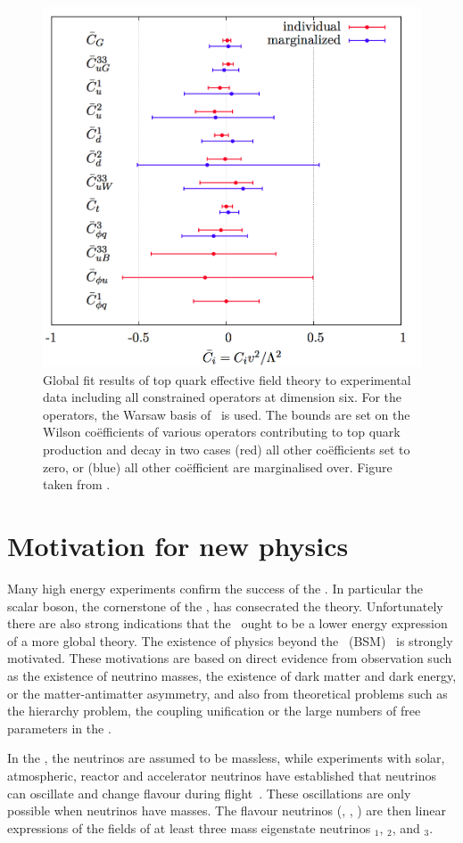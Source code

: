 \begin{figure}[htbp]
	\centering
	\includegraphics[width=0.6\linewidth]{1_Introduction/Figures/anomlouscouplings}
	\caption{Global fit results of top quark effective field theory to experimental data including all constrained operators at dimension six. For the operators, the Warsaw basis of~\cite{Grzadkowski:2010es} is used. The bounds are set on the Wilson co\"efficients of various operators contributing to top quark production and decay in two cases (red) all other co\"efficients set to zero, or (blue) all other co\"efficient are marginalised over. Figure taken from \cite{Buckley:2015lku}. }
	\label{fig:anomlouscouplings}
\end{figure}


\clearpage
\section{Motivation for new physics}
\label{sec:BSM}
Many high energy experiments confirm the success of the \SM. In particular the scalar boson, the cornerstone of the \SM, has consecrated the theory. Unfortunately there are also strong indications that the \SM\ ought to be a lower energy expression of a more global theory. The existence of physics beyond the \SM\ (BSM)~\cite{BSMWiley} is strongly motivated. These motivations are based on direct evidence from observation such as the existence of neutrino masses, the existence of dark matter and dark energy, or the matter-antimatter asymmetry, and also from theoretical problems such as the hierarchy problem, the coupling unification or the large numbers of free parameters in the \SM. 


In the \SM, the neutrinos are assumed to be massless, while experiments with solar, atmospheric, reactor and accelerator neutrinos have established that neutrinos can oscillate and change flavour during flight~\cite{Fukuda:1998mi,PhysRevLett.108.131801}. These oscillations are only possible when neutrinos have masses. The flavour neutrinos (\Pnue, \Pnum, \Pnut) are then linear expressions of the fields of at least three mass eigenstate neutrinos \Pnu$_1$, \Pnu$_2$, and \Pnu$_3$. 

